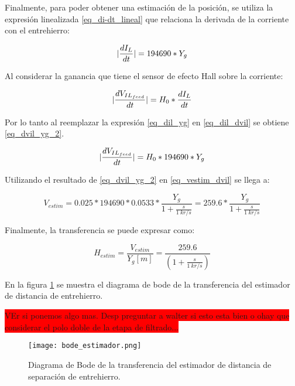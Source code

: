 Finalmente, para poder obtener una estimación de la posición, se utiliza la expresión linealizada \ref{eq_di-dt_lineal} que relaciona la derivada de la corriente con el entrehierro:

\begin{equation} \label{eq_dil_yg}
	\lvert\frac{dI_{L}}{dt}\rvert = 194690 * Y_{g}
\end{equation}


Al considerar la ganancia que tiene el sensor de efecto Hall sobre la corriente:

\begin{equation} \label{eq_dil_dvil}
	\lvert\frac{dV_{IL_{feed}}}{dt}\rvert= H_0*\frac{dI_{L}}{dt} 
\end{equation}

Por lo tanto al reemplazar la expresión \ref{eq_dil_yg} en \ref{eq_dil_dvil} se obtiene \ref{eq_dvil_yg_2}.

\begin{equation} \label{eq_dvil_yg_2}
	\lvert\frac{dV_{IL_{feed}}}{dt}\rvert = H_0*194690*Y_{g}
\end{equation}

Utilizando el resultado de \ref{eq_dvil_yg_2} en \ref{eq_vestim_dvil} se llega a:

\begin{equation}
	V_{estim}=0.025*194690*0.0533 * \frac{Y_{g}}{1 + \frac{s}{1\:kr/s}}=259.6*\frac{Y_{g}}{1 + \frac{s}{1\:kr/s}}	
\end{equation}

Finalmente, la transferencia se puede expresar como:

\begin{equation} \label{eq_TLC_deriv_7}
	H_{estim}=\frac{V_{estim}}{Y_{g}[m]}=\frac{259.6}{(1+\frac{s}{1\:kr/s})}
\end{equation}

En la figura \ref{fig:img_bode_estimdaor_final} se muestra el diagrama de bode de la transferencia del estimador de distancia de entrehierro.

\colorbox{red}{VEr si ponemos algo mas. Desp preguntar a walter si esto esta bien o ohay que considerar el polo doble de la etapa de filtrado...}

\begin{figure}[H]
	\centering
	\texttt{[image: bode\_estimador.png]}
	\caption{Diagrama de Bode de la transferencia del estimador de distancia de separación de entrehierro.}
	\label{fig:img_bode_estimdaor_final}
\end{figure}


